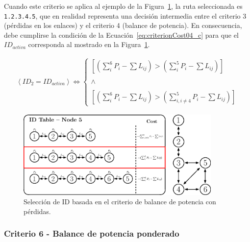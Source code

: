 Cuando este criterio se aplica al ejemplo de la Figura~\ref{fig:den2ne_09}, la ruta seleccionada es \texttt{1.2.3.4.5}, que en realidad representa una decisión intermedia entre el criterio 3 (pérdidas en los enlaces) y el criterio 4 (balance de potencia). En consecuencia, debe cumplirse la condición de la Ecuación~\ref{eq:criterionCost04_c} para que el $ID_{activa}$ corresponda al mostrado en la Figura~\ref{fig:den2ne_09}.


\begin{equation}\label{eq:criterionCost04_c}
\begin{split}
     \left \langle ID_{2} = ID_{activa} \right \rangle \Leftrightarrow 
     \left\{\begin{matrix}
    {\scriptstyle [(\sum_{i}^{6}P_{i} - \sum L_{ij} ) > (\sum_{i}^{5}P_{i} -  \sum L_{ij})]} \\
       \\
       \wedge \\ 
       \\
       {\scriptstyle[(\sum_{i}^{6}P_{i} -  \sum L_{ij}) > (\sum_{i,i\neq 4}^{5}P_{i} -  \sum L_{ij})]}
       \end{matrix}\right.
\end{split}
\end{equation}
\vspace{0.2cm}


\begin{figure}[ht!]
    \centering
    \includegraphics[width=0.9\textwidth]{fig/05_den2ne/den2ne_09.eps}
    \caption{Selección de ID basada en el criterio de balance de potencia con pérdidas.}
    \label{fig:den2ne_09}
\end{figure}

\subsubsection{Criterio 6 - Balance de potencia ponderado}


